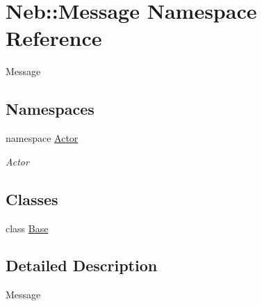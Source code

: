 \hypertarget{namespaceNeb_1_1Message}{\section{\-Neb\-:\-:\-Message \-Namespace \-Reference}
\label{namespaceNeb_1_1Message}
}


\-Message  


\subsection*{\-Namespaces}
\begin{DoxyCompactItemize}
\item 
namespace \hyperlink{namespaceNeb_1_1Message_1_1Actor}{\-Actor}
\begin{DoxyCompactList}\small\item\em \-Actor \end{DoxyCompactList}\end{DoxyCompactItemize}
\subsection*{\-Classes}
\begin{DoxyCompactItemize}
\item 
class \hyperlink{classNeb_1_1Message_1_1Base}{\-Base}
\end{DoxyCompactItemize}


\subsection{\-Detailed \-Description}
\-Message 